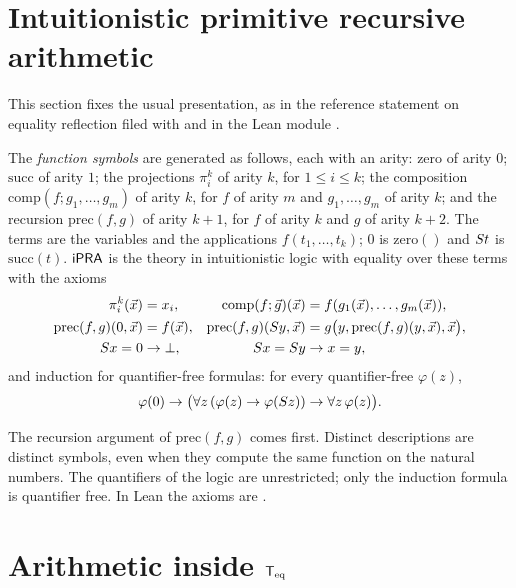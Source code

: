 \section{Intuitionistic primitive recursive arithmetic}
\label{base:sec:ipra}

This section fixes the usual presentation, as in the reference statement on
equality reflection filed with  and in the Lean module
.

\begin{definition}[$\iPRA$]
\label{base:def:ipra}
The \emph{function symbols} are generated as follows, each with an arity:
$\mathrm{zero}$ of arity $0$; $\mathrm{succ}$ of arity $1$; the projections
$\pi^k_i$ of arity $k$, for $1\le i\le k$; the composition
$\mathrm{comp}(f;g_1,\dots,g_m)$ of arity $k$, for $f$ of arity $m$ and
$g_1,\dots,g_m$ of arity $k$; and the recursion $\mathrm{prec}(f,g)$ of
arity $k+1$, for $f$ of arity $k$ and $g$ of arity $k+2$.  The terms are the
variables and the applications $f(t_1,\dots,t_k)$; $0$ is
$\mathrm{zero}()$ and $S t$ is $\mathrm{succ}(t)$.  $\iPRA$ is the
theory in intuitionistic logic with equality over these terms with the
axioms
\begin{align*}
 \pi^k_i(\vec x)&=x_i, &
 \mathrm{comp}(f;\vec g)(\vec x)&=f(g_1(\vec x),\dots,g_m(\vec x)),\\
 \mathrm{prec}(f,g)(0,\vec x)&=f(\vec x), &
 \mathrm{prec}(f,g)(S y,\vec x)&=g\bigl(y,\mathrm{prec}(f,g)(y,\vec x),\vec x\bigr),\\
 S x=0&\to\bot, & S x=S y&\to x=y,
\end{align*}
and induction for quantifier-free formulas: for every quantifier-free
$\varphi(z)$,
\[
 \varphi(0)\to\bigl(\forall z\,(\varphi(z)\to\varphi(S z))\to
 \forall z\,\varphi(z)\bigr).
\]
\end{definition}

The recursion argument of $\mathrm{prec}(f,g)$ comes first.  Distinct
descriptions are distinct symbols, even when they compute the same function
on the natural numbers.  The quantifiers of the logic are unrestricted; only
the induction formula is quantifier free.  In Lean the axioms are
.

\section{Arithmetic inside \texorpdfstring{$\mathsf{T}_{\mathrm{eq}}$}{Teq}}
\label{base:sec:arith}

